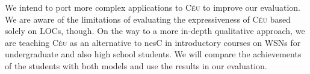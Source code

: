 \documentclass[10pt]{sigplan-proc-varsize-sensys11}
\newcommand{\2}{\;\;}
\newcommand{\5}{\;\;\;\;\;}
\newcommand{\CEU}{\textsc{C\'{e}u}}
\begin{document}
We intend to port more complex applications to \CEU{} to improve our 
evaluation.
We are aware of the limitations of evaluating the expressiveness of \CEU{} 
based solely on LOCs, though.
On the way to a more in-depth qualitative approach, we are teaching \CEU{} as 
an alternative to nesC in introductory courses on WSNs for undergraduate and 
also high school students.
We will compare the achievements of the students with both models and use the 
results in our evaluation.

{\footnotesize


}
\end{document}
